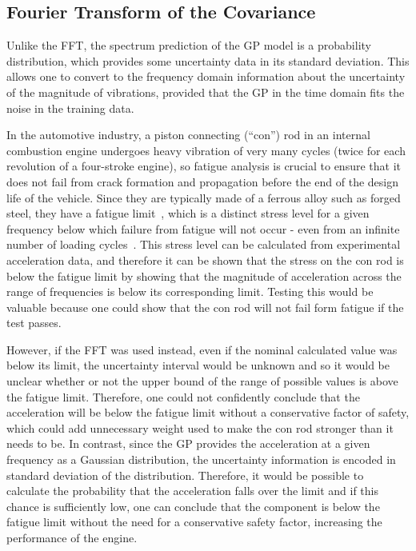 \documentclass[12pt]{article}
\begin{document}
    \subsection{Fourier Transform of the Covariance}
    Unlike the FFT, the spectrum prediction of the GP model is a probability distribution, which provides some uncertainty data in its standard deviation.
    This allows one to convert to the frequency domain information about the uncertainty of the magnitude of vibrations, provided that the GP in the time domain fits the noise in the training data.

    In the automotive industry, a piston connecting (``con'') rod in an internal combustion engine undergoes heavy vibration of very many cycles (twice for each revolution of a four-stroke engine), so fatigue analysis is crucial to ensure that it does not fail from crack formation and propagation before the end of the design life of the vehicle.
    Since they are typically made of a ferrous alloy such as forged steel, they have a fatigue limit~\cite{RoymechFatigue}, which is a distinct stress level for a given frequency below which failure from fatigue will not occur - even from an infinite number of loading cycles~\cite{BeerJohnston1992}.
    This stress level can be calculated from experimental acceleration data, and therefore it can be shown that the stress on the con rod is below the fatigue limit by showing that the magnitude of acceleration across the range of frequencies is below its corresponding limit.
    Testing this would be valuable because one could show that the con rod will not fail form fatigue if the test passes.

    However, if the FFT was used instead, even if the nominal calculated value was below its limit, the uncertainty interval would be unknown and so it would be unclear whether or not the upper bound of the range of possible values is above the fatigue limit.
    Therefore, one could not confidently conclude that the acceleration will be below the fatigue limit without a conservative factor of safety, which could add unnecessary weight used to make the con rod stronger than it needs to be.
    In contrast, since the GP provides the acceleration at a given frequency as a Gaussian distribution, the uncertainty information is encoded in standard deviation of the distribution.
    Therefore, it would be possible to calculate the probability that the acceleration falls over the limit and if this chance is sufficiently low, one can conclude that the component is below the fatigue limit without the need for a conservative safety factor, increasing the performance of the engine.
\end{document}
